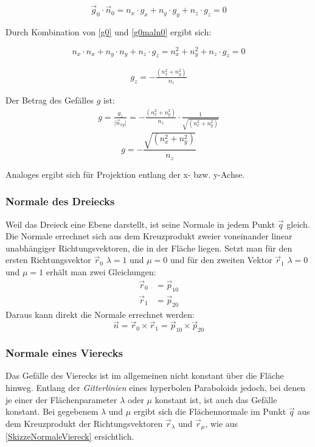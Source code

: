 \begin{equation}
	\label{g0maln0}
	\vec{g}_{0} \cdot \vec{n}_{0} =  n_{x} \cdot g_{x} +  n_{y} \cdot g_{y} + n_{z} \cdot  g_{z} = 0
\end{equation}

Durch Kombination von \cref{g0} und \cref{g0maln0} ergibt sich:

\begin{equation}
	\nonumber
	n_{x} \cdot n_{x} +  n_{y} \cdot n_{y} + n_{z} \cdot  g_{z} = n_{x}^{2} + n_{y}^{2} + n_{z} \cdot g_{z} = 0
\end{equation}

\begin{align}
	\boxed{ g_{z} = - \frac{(n_{x}^{2} + n_{y}^{2} )}{n_{z}} }
\end{align}

Der Betrag des Gefälles $g$ ist:
\begin{align*}
	g=\frac{ g_{z}}{ \lvert \vec{n}_{xy} \rvert }
	=- \frac{(n_{x}^{2} + n_{y}^{2})}{n_{z}} \cdot \frac{1}{\sqrt{(n_{x}^{2} + n_{y}^{2})}}
\end{align*}
\begin{equation}
	\boxed{g= - \frac{\sqrt{(n_{x}^{2} + n_{y}^{2})}}{n_{z}} }
\end{equation}

Analoges ergibt sich für Projektion entlang der x- bzw. y-Achse.

\subsubsection{Normale des Dreiecks}
Weil das Dreieck eine Ebene darstellt, ist seine Normale in jedem Punkt $\vec{q}$ gleich. Die Normale errechnet sich aus dem Kreuzprodukt zweier voneinander linear unabhängiger Richtungsvektoren, die in der Fläche liegen. Setzt man für den ersten Richtungsvektor $\vec{r}_{0}$ $\lambda = 1$ und $\mu = 0$ und für den zweiten Vektor $\vec{r}_{1}$ $\lambda = 0$ und $\mu = 1$ erhält man zwei Gleichungen:
\begin{align*}
	\vec{r}_{0} &=  \vec{p}_{10} \\
	\vec{r}_{1} &=  \vec{p}_{20}
\end{align*}
Daraus kann direkt die Normale errechnet werden:
\begin{equation}
	\boxed{
		\vec{n} = \vec{r}_{0} \times \vec{r}_{1} = \vec{p}_{10} \times \vec{p}_{20}
	}
\end{equation}

\subsubsection{Normale eines Vierecks}
Das Gefälle des Vierecks ist im allgemeinen nicht konstant über die Fläche hinweg. Entlang der \emph{Gitterlinien} eines hyperbolen Paraboloids jedoch, bei denen je einer der Flächenparameter $\lambda$ oder $\mu$ konstant ist, ist auch das Gefälle konstant. Bei gegebenem $\lambda$ und $\mu$ ergibt sich die Flächennormale im Punkt $\vec{q}$ aus dem Kreuzprodukt der Richtungsvektoren $\vec{r}_{\lambda}$ und $\vec{r}_{\mu}$, wie aus \cref{SkizzeNormaleViereck} ersichtlich.

